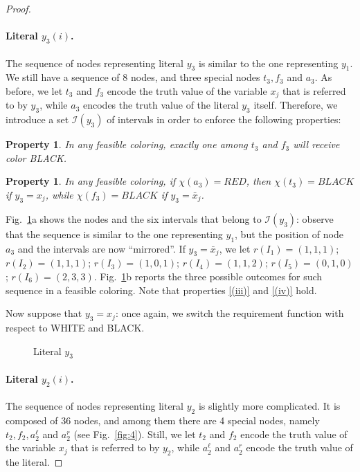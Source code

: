 \documentclass[a4paper,11pt]{article}
\theoremstyle{theorem}
\newtheorem{property}[theorem]{Property}
\begin{document}
\begin{proof}
\paragraph{Literal $y_3(i)$.}  The sequence of nodes representing literal $y_3$ is similar to the one representing $y_1$.  We still have a sequence of 8 nodes, and three special nodes $t_3,f_3$ and $a_3$.
As before, we let $t_3$ and $f_3$ encode the truth value of the variable $x_j$ that is referred to by $y_3$, while $a_3$ encodes the truth value of the literal $y_3$ itself. Therefore, we introduce a set $\mathcal I(y_3)$ of intervals in order to 
enforce the following properties:

\begin{property}\label{(iii)}
In any feasible coloring, exactly one among $t_3$ and $f_3$ will receive color BLACK. 
\end{property}

\begin{property}\label{(iv)}
In any feasible coloring, if $\chi(a_3) = RED$, then $\chi(t_3) = BLACK$ if $y_3 = x_j$, while $\chi(f_3) = BLACK$ if $y_3 = \bar x_j$. 
\end{property}

\noindent Fig.~\ref{fig:3}a shows the nodes and the six intervals that belong to $\mathcal I(y_3)$: observe that the sequence is similar to the one representing $y_1$,  but the position of node $a_3$  and the intervals are now ``mirrored''.
If $y_3 = \bar x_j$, we let $r(I_1)= (1,1,1)$;  $r(I_2)= (1,1,1)$;  $r(I_3)= (1,0,1)$;  $r(I_4)= (1,1,2)$;  $r(I_5)= (0,1,0)$;  $r(I_6)= (2,3,3)$.  
Fig.~\ref{fig:3}b reports the three possible outcomes for such sequence in a feasible coloring.  
Note that properties \eqref{(iii)} and \eqref{(iv)} hold.

Now suppose that $y_3 = x_j$: once again, we switch the requirement function with respect to WHITE and BLACK.

\begin{figure}[htb]
\centering
{} \hspace*{0.05 \textwidth} 
\caption{Literal $y_3$}
\label{fig:3}
\end{figure}

\paragraph{Literal $y_2(i)$.} The sequence of nodes representing literal $y_2$ is slightly more complicated. It is composed of 36 nodes, and among them there are 4 special nodes, namely $t_2,f_2,a_2^{\ell}$ and $a_2^r$ (see Fig.~\ref{fig:4}). 
Still, we let $t_2$ and $f_2$ encode the truth value of the variable $x_j$ that is referred to by $y_2$, while $a_2^{\ell}$ and $a_2^r$ encode the truth value of the literal. 


\end{proof}
\end{document}
